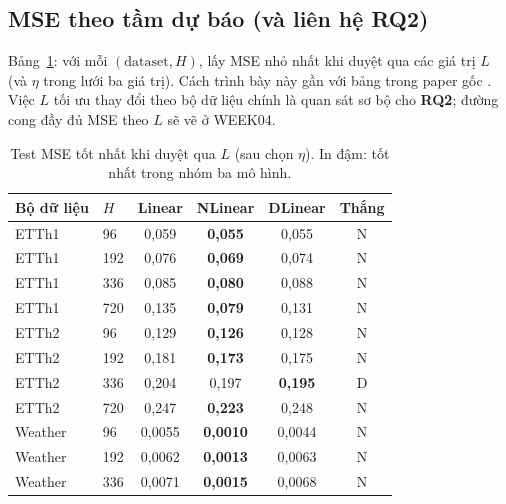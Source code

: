 \subsection{MSE theo tầm dự báo (và liên hệ RQ2)}

Bảng~\ref{tab:bestL}: với mỗi \((\mathrm{dataset},H)\), lấy MSE nhỏ nhất
khi duyệt qua các giá trị \(L\) (và \(\eta\) trong lưới ba giá trị).
Cách trình bày này gần với bảng trong paper gốc \cite{zeng2023ltsf}.
Việc \(L\) tối ưu thay đổi theo bộ dữ liệu chính là quan sát sơ bộ cho \textbf{RQ2};
đường cong đầy đủ MSE theo \(L\) sẽ vẽ ở WEEK04.

\begin{table}[H]
  \centering
  \caption{Test MSE tốt nhất khi duyệt qua \(L\) (sau chọn \(\eta\)).
    In đậm: tốt nhất trong nhóm ba mô hình.}
  \label{tab:bestL}
  \scriptsize
  \setlength{\tabcolsep}{3.5pt}
  \begin{tabular}{@{}llcccc@{}}
    \toprule
    Bộ dữ liệu  & \(H\) & Linear           & NLinear           & DLinear          & Thắng \\
    \midrule
    ETTh1       & 96    & 0{,}059          & \textbf{0{,}055}  & 0{,}055          & N     \\
    ETTh1       & 192   & 0{,}076          & \textbf{0{,}069}  & 0{,}074          & N     \\
    ETTh1       & 336   & 0{,}085          & \textbf{0{,}080}  & 0{,}088          & N     \\
    ETTh1       & 720   & 0{,}135          & \textbf{0{,}079}  & 0{,}131          & N     \\
    \midrule
    ETTh2       & 96    & 0{,}129          & \textbf{0{,}126}  & 0{,}128          & N     \\
    ETTh2       & 192   & 0{,}181          & \textbf{0{,}173}  & 0{,}175          & N     \\
    ETTh2       & 336   & 0{,}204          & 0{,}197           & \textbf{0{,}195} & D     \\
    ETTh2       & 720   & 0{,}247          & \textbf{0{,}223}  & 0{,}248          & N     \\
    \midrule
    Weather     & 96    & 0{,}0055         & \textbf{0{,}0010} & 0{,}0044         & N     \\
    Weather     & 192   & 0{,}0062         & \textbf{0{,}0013} & 0{,}0063         & N     \\
    Weather     & 336   & 0{,}0071         & \textbf{0{,}0015} & 0{,}0068         & N     \\

\end{tabular}
\end{table}
